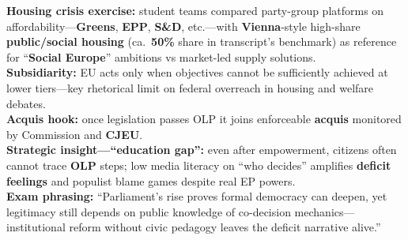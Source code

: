 \documentclass[10pt,a4paper]{article}
\begin{document}
{\textbf{Housing crisis exercise:} student teams compared party-group platforms on affordability---\textbf{Greens}, \textbf{EPP}, \textbf{S\&D}, etc.---with \textbf{Vienna}-style high-share \textbf{public/social housing} (ca.\ \textbf{50\%} share in transcript's benchmark) as reference for ``\textbf{Social Europe}'' ambitions vs market-led supply solutions.\\
\textbf{Subsidiarity:} EU acts only when objectives cannot be sufficiently achieved at lower tiers---key rhetorical limit on federal overreach in housing and welfare debates.\\
\textbf{Acquis hook:} once legislation passes OLP it joins enforceable \textbf{acquis} monitored by Commission and \textbf{CJEU}.\\
\textbf{Strategic insight---``education gap'':} even after empowerment, citizens often cannot trace \textbf{OLP} steps; low media literacy on ``who decides'' amplifies \textbf{deficit feelings} and populist blame games despite real EP powers.\\
\textbf{Exam phrasing:} ``Parliament's rise proves formal democracy can deepen, yet legitimacy still depends on public knowledge of co-decision mechanics---institutional reform without civic pedagogy leaves the deficit narrative alive.''
}
\end{document}
